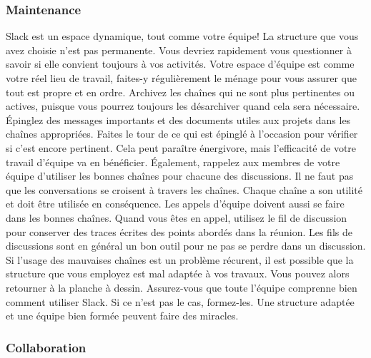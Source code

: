\documentclass[
  letterpaper,
]{scrbook}
\begin{document}
\hypertarget{maintenance}{%
\subsubsection{Maintenance}\label{maintenance}}

Slack est un espace dynamique, tout comme votre équipe! La structure que
vous avez choisie n'est pas permanente. Vous devriez rapidement vous
questionner à savoir si elle convient toujours à vos activités. Votre
espace d'équipe est comme votre réel lieu de travail, faites-y
régulièrement le ménage pour vous assurer que tout est propre et en
ordre. Archivez les chaînes qui ne sont plus pertinentes ou actives,
puisque vous pourrez toujours les désarchiver quand cela sera
nécessaire. Épinglez des messages importants et des documents utiles aux
projets dans les chaînes appropriées. Faites le tour de ce qui est
épinglé à l'occasion pour vérifier si c'est encore pertinent. Cela peut
paraître énergivore, mais l'efficacité de votre travail d'équipe va en
bénéficier. Également, rappelez aux membres de votre équipe d'utiliser
les bonnes chaînes pour chacune des discussions. Il ne faut pas que les
conversations se croisent à travers les chaînes. Chaque chaîne a son
utilité et doit être utilisée en conséquence. Les appels d'équipe
doivent aussi se faire dans les bonnes chaînes. Quand vous êtes en
appel, utilisez le fil de discussion pour conserver des traces écrites
des points abordés dans la réunion. Les fils de discussions sont en
général un bon outil pour ne pas se perdre dans un discussion. Si
l'usage des mauvaises chaînes est un problème récurent, il est possible
que la structure que vous employez est mal adaptée à vos travaux. Vous
pouvez alors retourner à la planche à dessin. Assurez-vous que toute
l'équipe comprenne bien comment utiliser Slack. Si ce n'est pas le cas,
formez-les. Une structure adaptée et une équipe bien formée peuvent
faire des miracles.

\hypertarget{collaboration}{%
\subsubsection{Collaboration}\label{collaboration}}
\end{document}
